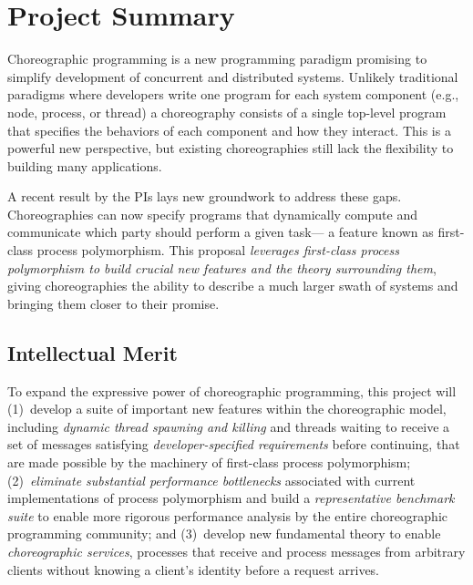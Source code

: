 



\section*{Project Summary}


Choreographic programming is a new programming paradigm promising to simplify development of concurrent and distributed systems.
Unlikely traditional paradigms where developers write one program for each system component (e.g., node, process, or thread)
a choreography consists of a single top-level program that specifies the behaviors of each component and how they interact.
This is a powerful new perspective, but existing choreographies still lack the flexibility to building many applications.

A recent result by the PIs lays new groundwork to address these gaps.
Choreographies can now specify programs that dynamically compute and communicate which party should perform a given task---%
a feature known as first-class process polymorphism.
This proposal \emph{leverages first-class process polymorphism to build crucial new features and the theory surrounding them},
giving choreographies the ability to describe a much larger swath of systems and bringing them closer to their promise.

\subsection*{Intellectual Merit}

To expand the expressive power of choreographic programming, this project will
(1)~develop a suite of important new features within the choreographic model,
including \emph{dynamic thread spawning and killing}
and threads waiting to receive a set of messages satisfying \emph{developer-specified requirements} before continuing,
that are made possible by the machinery of first-class process polymorphism;
(2)~\emph{eliminate substantial performance bottlenecks} associated with current implementations of process polymorphism
and build a \emph{representative benchmark suite} to enable more rigorous performance analysis by the entire choreographic programming community;
and (3)~develop new fundamental theory to enable \emph{choreographic services},
processes that receive and process messages from arbitrary clients without knowing a client's identity before a request arrives.

